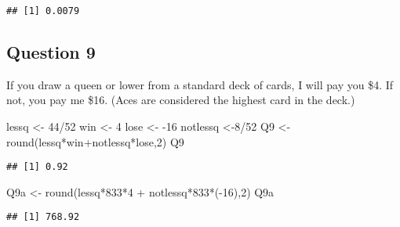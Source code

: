 \documentclass[
]{article}
\newenvironment{Shaded}{\begin{snugshade}}{\end{snugshade}}
\newcommand{\DecValTok}[1]{\textcolor[rgb]{0.00,0.00,0.81}{#1}}
\newcommand{\FunctionTok}[1]{\textcolor[rgb]{0.00,0.00,0.00}{#1}}
\newcommand{\NormalTok}[1]{#1}
\newcommand{\OtherTok}[1]{\textcolor[rgb]{0.56,0.35,0.01}{#1}}
\newcommand{\SpecialCharTok}[1]{\textcolor[rgb]{0.00,0.00,0.00}{#1}}
\begin{document}
\begin{verbatim}
## [1] 0.0079
\end{verbatim}

\hypertarget{question-9}{%
\subsection{Question 9}\label{question-9}}

If you draw a queen or lower from a standard deck of cards, I will pay
you \$4. If not, you pay me \$16. (Aces are considered the highest card
in the deck.)

\begin{Shaded}
\begin{Highlighting}[]
\NormalTok{lessq }\OtherTok{\textless{}{-}} \DecValTok{44}\SpecialCharTok{/}\DecValTok{52}
\NormalTok{win }\OtherTok{\textless{}{-}} \DecValTok{4}
\NormalTok{lose }\OtherTok{\textless{}{-}} \SpecialCharTok{{-}}\DecValTok{16}
\NormalTok{notlessq }\OtherTok{\textless{}{-}}\DecValTok{8}\SpecialCharTok{/}\DecValTok{52}
\NormalTok{Q9 }\OtherTok{\textless{}{-}} \FunctionTok{round}\NormalTok{(lessq}\SpecialCharTok{*}\NormalTok{win}\SpecialCharTok{+}\NormalTok{notlessq}\SpecialCharTok{*}\NormalTok{lose,}\DecValTok{2}\NormalTok{)}
\NormalTok{Q9 }
\end{Highlighting}
\end{Shaded}

\begin{verbatim}
## [1] 0.92
\end{verbatim}

\begin{Shaded}
\begin{Highlighting}[]
\NormalTok{Q9a }\OtherTok{\textless{}{-}} \FunctionTok{round}\NormalTok{(lessq}\SpecialCharTok{*}\DecValTok{833}\SpecialCharTok{*}\DecValTok{4} \SpecialCharTok{+}\NormalTok{ notlessq}\SpecialCharTok{*}\DecValTok{833}\SpecialCharTok{*}\NormalTok{(}\SpecialCharTok{{-}}\DecValTok{16}\NormalTok{),}\DecValTok{2}\NormalTok{)}
\NormalTok{Q9a}
\end{Highlighting}
\end{Shaded}

\begin{verbatim}
## [1] 768.92
\end{verbatim}
\end{document}
